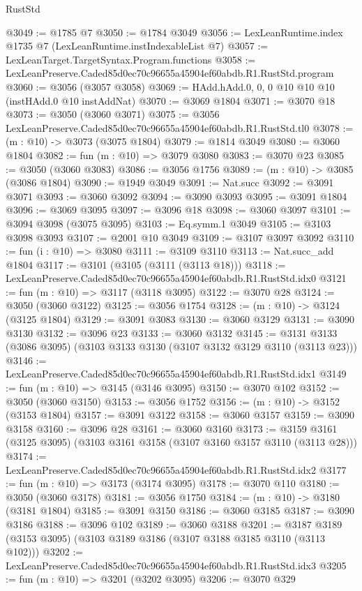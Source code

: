 \begin{lexlean}{RustStd}
\begin{coremodule}
@3049 := @1785 @7
@3050 := @1784 @3049
@3056 := LexLeanRuntime.index @1735 @7 (LexLeanRuntime.instIndexableList @7)
@3057 := LexLeanTarget.TargetSyntax.Program.functions
@3058 := LexLeanPreserve.Caded85d0ec70c96655a45904ef60abdb.R1.RustStd.program
@3060 := @3056 (@3057 @3058)
@3069 := HAdd.hAdd.{0, 0, 0} @10 @10 @10 (instHAdd.{0} @10 instAddNat)
@3070 := @3069 @1804
@3071 := @3070 @18
@3073 := @3050 (@3060 @3071)
@3075 := @3056 LexLeanPreserve.Caded85d0ec70c96655a45904ef60abdb.R1.RustStd.tl0
@3078 := (m : @10) -> @3073 (@3075 @1804)
@3079 := @1814 @3049
@3080 := @3060 @1804
@3082 := fun (m : @10) => @3079 @3080
@3083 := @3070 @23
@3085 := @3050 (@3060 @3083)
@3086 := @3056 @1756
@3089 := (m : @10) -> @3085 (@3086 @1804)
@3090 := @1949 @3049
@3091 := Nat.succ
@3092 := @3091 @3071
@3093 := @3060 @3092
@3094 := @3090 @3093
@3095 := @3091 @1804
@3096 := @3069 @3095
@3097 := @3096 @18
@3098 := @3060 @3097
@3101 := @3094 @3098 (@3075 @3095)
@3103 := Eq.symm.{1} @3049
@3105 := @3103 @3098 @3093
@3107 := @2001 @10 @3049
@3109 := @3107 @3097 @3092
@3110 := fun (i : @10) => @3080
@3111 := @3109 @3110
@3113 := Nat.succ_add @1804
@3117 := @3101 (@3105 (@3111 (@3113 @18)))
@3118 := LexLeanPreserve.Caded85d0ec70c96655a45904ef60abdb.R1.RustStd.idx0
@3121 := fun (m : @10) => @3117 (@3118 @3095)
@3122 := @3070 @28
@3124 := @3050 (@3060 @3122)
@3125 := @3056 @1754
@3128 := (m : @10) -> @3124 (@3125 @1804)
@3129 := @3091 @3083
@3130 := @3060 @3129
@3131 := @3090 @3130
@3132 := @3096 @23
@3133 := @3060 @3132
@3145 := @3131 @3133 (@3086 @3095) (@3103 @3133 @3130 (@3107 @3132 @3129 @3110 (@3113 @23)))
@3146 := LexLeanPreserve.Caded85d0ec70c96655a45904ef60abdb.R1.RustStd.idx1
@3149 := fun (m : @10) => @3145 (@3146 @3095)
@3150 := @3070 @102
@3152 := @3050 (@3060 @3150)
@3153 := @3056 @1752
@3156 := (m : @10) -> @3152 (@3153 @1804)
@3157 := @3091 @3122
@3158 := @3060 @3157
@3159 := @3090 @3158
@3160 := @3096 @28
@3161 := @3060 @3160
@3173 := @3159 @3161 (@3125 @3095) (@3103 @3161 @3158 (@3107 @3160 @3157 @3110 (@3113 @28)))
@3174 := LexLeanPreserve.Caded85d0ec70c96655a45904ef60abdb.R1.RustStd.idx2
@3177 := fun (m : @10) => @3173 (@3174 @3095)
@3178 := @3070 @110
@3180 := @3050 (@3060 @3178)
@3181 := @3056 @1750
@3184 := (m : @10) -> @3180 (@3181 @1804)
@3185 := @3091 @3150
@3186 := @3060 @3185
@3187 := @3090 @3186
@3188 := @3096 @102
@3189 := @3060 @3188
@3201 := @3187 @3189 (@3153 @3095) (@3103 @3189 @3186 (@3107 @3188 @3185 @3110 (@3113 @102)))
@3202 := LexLeanPreserve.Caded85d0ec70c96655a45904ef60abdb.R1.RustStd.idx3
@3205 := fun (m : @10) => @3201 (@3202 @3095)
@3206 := @3070 @329

\end{coremodule}
\end{lexlean}
